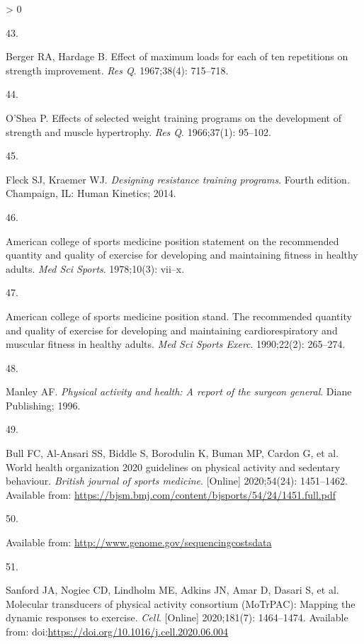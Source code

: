 \documentclass[twoside,10pt]{gihclass} %
\newlength{\cslhangindent}
\newlength{\csllabelwidth}
\newenvironment{CSLReferences}[3] %
 {%
  \setlength{\parindent}{0pt}
  \ifodd #1 \everypar{\setlength{\hangindent}{\cslhangindent}}\ignorespaces\fi
  \ifnum #2 > 0
  \setlength{\parskip}{#2\baselineskip}
  \fi
 }%
 {}
\newcommand{\CSLLeftMargin}[1]{\parbox[t]{\maxof{\widthof{#1}}{\csllabelwidth}}{#1}}
\newcommand{\CSLRightInline}[1]{\parbox[t]{\linewidth}{#1}}
\begin{document}
\begin{CSLReferences}{0}{0}
\leavevmode\hypertarget{ref-RN2658}{}%
\CSLLeftMargin{43. }
\CSLRightInline{Berger RA, Hardage B. Effect of maximum loads for each of ten repetitions on strength improvement. \emph{Res Q}. 1967;38(4): 715--718. }

\leavevmode\hypertarget{ref-RN2656}{}%
\CSLLeftMargin{44. }
\CSLRightInline{O'Shea P. Effects of selected weight training programs on the development of strength and muscle hypertrophy. \emph{Res Q}. 1966;37(1): 95--102. }

\leavevmode\hypertarget{ref-RN2537}{}%
\CSLLeftMargin{45. }
\CSLRightInline{Fleck SJ, Kraemer WJ. \emph{Designing resistance training programs}. Fourth edition. Champaign, IL: Human Kinetics; 2014. }

\leavevmode\hypertarget{ref-RN2655}{}%
\CSLLeftMargin{46. }
\CSLRightInline{American college of sports medicine position statement on the recommended quantity and quality of exercise for developing and maintaining fitness in healthy adults. \emph{Med Sci Sports}. 1978;10(3): vii--x. }

\leavevmode\hypertarget{ref-RN2654}{}%
\CSLLeftMargin{47. }
\CSLRightInline{American college of sports medicine position stand. The recommended quantity and quality of exercise for developing and maintaining cardiorespiratory and muscular fitness in healthy adults. \emph{Med Sci Sports Exerc}. 1990;22(2): 265--274. }

\leavevmode\hypertarget{ref-RN2666}{}%
\CSLLeftMargin{48. }
\CSLRightInline{Manley AF. \emph{Physical activity and health: A report of the surgeon general}. Diane Publishing; 1996. }

\leavevmode\hypertarget{ref-RN2667}{}%
\CSLLeftMargin{49. }
\CSLRightInline{Bull FC, Al-Ansari SS, Biddle S, Borodulin K, Buman MP, Cardon G, et al. World health organization 2020 guidelines on physical activity and sedentary behaviour. \emph{British journal of sports medicine}. {[}Online{]} 2020;54(24): 1451--1462. Available from: \url{https://bjsm.bmj.com/content/bjsports/54/24/1451.full.pdf}}

\leavevmode\hypertarget{ref-RN2696}{}%
\CSLLeftMargin{50. }
\CSLRightInline{Available from: \url{http://www.genome.gov/sequencingcostsdata}}

\leavevmode\hypertarget{ref-RN2678}{}%
\CSLLeftMargin{51. }
\CSLRightInline{Sanford JA, Nogiec CD, Lindholm ME, Adkins JN, Amar D, Dasari S, et al. Molecular transducers of physical activity consortium (MoTrPAC): Mapping the dynamic responses to exercise. \emph{Cell}. {[}Online{]} 2020;181(7): 1464--1474. Available from: doi:\url{https://doi.org/10.1016/j.cell.2020.06.004}}


\end{CSLReferences}
\end{document}
